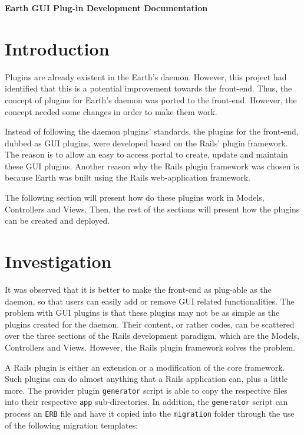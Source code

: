 \documentclass{article}
\begin{document}
\begin{titlepage}
    \begin{center}
        \textbf{\huge Earth GUI Plug-in Development Documentation}
    \end{center}
\end{titlepage}

\tableofcontents
\listoffigures
\newpage

\section{Introduction} %

Plugins are already existent in the Earth's daemon. However, this project had identified that this is a potential improvement towards the front-end. Thus, the concept of plugins for Earth's daemon was ported to the front-end. However, the concept needed some changes in order to make them work. 

Instead of following the daemon plugins' standards, the plugins for the front-end, dubbed as GUI plugins, were developed based on the Rails' plugin framework. The reason is to allow an easy to access portal to create, update and maintain these GUI plugins. Another reason why the Rails plugin framework was chosen is because Earth was built using the Rails web-application framework. 

The following section will present how do these plugins work in Models, Controllers and Views. Then, the rest of the sections will present how the plugins can be created and deployed.


\section{Investigation} %

It was observed that it is better to make the front-end as plug-able as the daemon, so that users can easily add or remove GUI related functionalities. The problem with GUI plugins is that these plugins may not be as simple as the plugins created for the daemon. Their content, or rather codes, can be scattered over the three sections of the Rails development paradigm, which are the Models, Controllers and Views. However, the Rails plugin framework solves the problem. 

A Rails plugin is either an extension or a modification of the core framework. Such plugins can do almost anything that a Rails application can, plus a little more. The provider plugin \texttt{generator} script is able to copy the respective files into their respective \texttt{app} sub-directories. In addition, the \texttt{generator} script can process an \texttt{ERB} file and have it copied into the \texttt{migration} folder through the use of the following migration templates:
\end{document}
